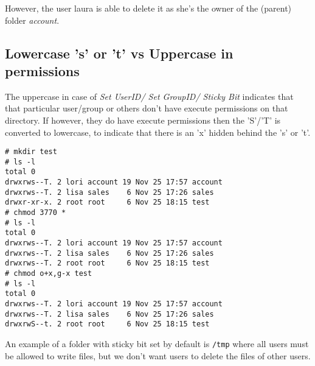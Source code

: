 \noindent
However, the user laura is able to delete it as she's the owner of the (parent) folder \textit{account}. 

\subsection{Lowercase 's' or 't' vs Uppercase in permissions}
The uppercase in case of \textit{Set UserID/ Set GroupID/ Sticky Bit} indicates that that particular user/group or others don't have execute permissions on that directory. If however, they do have execute permissions then the 'S'/'T' is converted to lowercase, to indicate that there is an 'x' hidden behind the 's' or 't'. 

\vspace{-15pt}
\begin{verbatim}
# mkdir test
# ls -l
total 0
drwxrws--T. 2 lori account 19 Nov 25 17:57 account
drwxrws--T. 2 lisa sales    6 Nov 25 17:26 sales
drwxr-xr-x. 2 root root     6 Nov 25 18:15 test
# chmod 3770 *
# ls -l
total 0
drwxrws--T. 2 lori account 19 Nov 25 17:57 account
drwxrws--T. 2 lisa sales    6 Nov 25 17:26 sales
drwxrws--T. 2 root root     6 Nov 25 18:15 test
# chmod o+x,g-x test
# ls -l
total 0
drwxrws--T. 2 lori account 19 Nov 25 17:57 account
drwxrws--T. 2 lisa sales    6 Nov 25 17:26 sales
drwxrwS--t. 2 root root     6 Nov 25 18:15 test
\end{verbatim}
\vspace{-10pt}

\noindent
An example of a folder with sticky bit set by default is \verb|/tmp| where all users must be allowed to write files, but we don't want users to delete the files of other users.